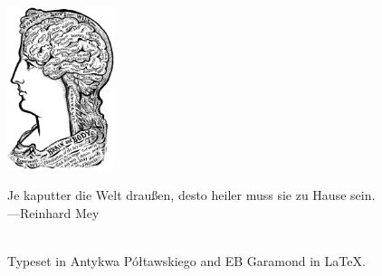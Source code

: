 \documentclass{article}
\renewcommand{\c}[1]{{\textcolor{christmas}{#1}}}
\begin{document}
\vfill\includegraphics[height=4.75cm]{head}

\vfill\begin{minipage}[c]{.8\textwidth}\centering%
    \c{\glqq}Je kaputter die Welt draußen,
    desto heiler muss sie zu Hause sein.\c{\grqq}\\[2mm]
    \c{---}Reinhard Mey
\end{minipage}

\newpage\restoregeometry %
~\\[-2\baselineskip]\vfill
{\small Typeset in Antykwa Półtawskiego and EB Garamond in \LaTeX.}
\end{document}
